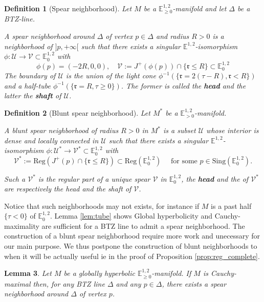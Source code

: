 \documentclass[a4paper,12pt]{article}
\def\r{\mathfrak{r}}
\def\U{\mathcal U}
\def\V{\mathcal V}
\def\sing{\mathrm{Sing}}
\newcommand{\mass}[1]{{\mathbb E}^{1,2}_{#1}}
\def\Reg{\mathrm{Reg}}
\def\reg{\Reg}
\newtheorem{lemou}{Lemma}[section]          %
\newtheorem{defou}[lemou]{Definition}    %
\begin{document}
   \begin{defou}[Spear neighborhood]\label{btzdef:spear_neighborhood} Let $M$ be a $\mass{\geq0}$-manifold and let $\Delta$ be a BTZ-line. 
   
   
   A spear neighborhood around $\Delta$ of vertex $p\in \Delta$ and radius $R>0$ is a neighborhood of $]p,+\infty[$ such that there exists a singular $\mass{}$-isomorphism 
   $\phi: \U\rightarrow \V\subset \mass{0}$ with 
   $$\phi(p)=(-2R,0,0),\quad  \V:= J^+(\phi(p)) \cap \{\r\leq R\}\subset \mass{0}$$ 
   The boundary of $\U$ is the union of the light cone $\phi^{-1}(\{\r = 2(\tau-R),\r<R\})$ and a half-tube $\phi^{-1}(\{\r=R, \tau\geq 0\})$. The former is called the \textbf{head} and the latter the \textbf{shaft} of $\U$.
   

  \end{defou}
  \begin{defou}[Blunt spear neighborhood]\label{btzdef:blunt_spear_neighborhood}
  Let $M^*$ be a $\mass{>0}$-manifold.
  
   A blunt spear neighborhood of radius $R>0$ in $M^*$ is a subset $\U$ whose interior is dense and locally connected in $\U$ such that there exists a singular $\mass{}$-isomorphism 
   $\phi: \U^*\rightarrow \V^*\subset \mass{0}$ with 
   $$ \V^*:= \reg(J^+(p) \cap \{\r\leq R\})\subset \reg(\mass{0}) \quad\text{ for some } p \in \sing(\mass{0}).$$ 
   
   Such a $\V^*$ is the regular part of a unique spear $\V$ in $\mass{0}$, the \textbf{head} and the  of $\V^*$ are respectively the head and the shaft of $\V$.
  \end{defou}
 Notice that such neighborhoods may not exists, for instance if $M$ is a past half  $\{\tau<0\}$  of $\mass{0}$.  Lemma \ref{lem:tube} shows Global hyperbolicity and Cauchy-maximality are sufficient for a BTZ line  to admit a spear neighborhood.
 The construction of a blunt spear neighborhood require more work and unecessary for our main purpose. We thus postpone the construction of blunt neighborhoods to when it will be actually useful ie in the proof of Proposition \ref{prop:reg_complete}.
   
   

    \begin{lemou}\label{btzlem:tube} \label{lem:tube}
	  Let $M$  be a globally hyperbolic $\mass{\geq0}$-manifold.
	 If  $M$ is Cauchy-maximal then, for any  BTZ line $\Delta$ and any $p\in \Delta$, there exists a spear neighborhood around $\Delta$ of vertex $p$.
	\end{lemou}
   
\end{document}
